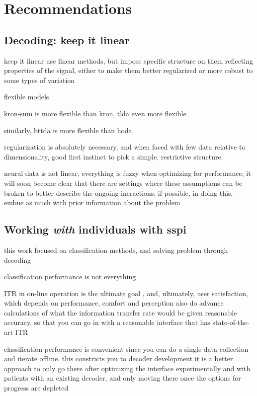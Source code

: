 \section{Recommendations}

\subsection{Decoding: keep it linear}

keep it linear
use linear methods, but impose specific structure on them reflecting properties
of the signal, either to make them better regularized or more robust to some
types of variation

flexible models

kron-sum is more flexible than kron, tlda even more flexible

similarly, bttda is more flexible than hoda

regularization is absolutely necessary, and when faced with few data relative
to dimensionality, good first instinct to pick a simple, restrictive structure.

neural data is not linear, everything is fuzzy
when optimizing for performance, it will soon become clear that there are
settings where these assumptions can be broken to better describe the ongoing
ineractions.
if possible, in doing this, embue as much with prior information about the problem


\subsection{Working \emph{with} individuals with \acs{sspi}}

this work focused on classification methods, and solving problem through
decoding

classification performance is not everything

ITR in on-line operation is the ultimate goal
, and, ultimately, user satisfaction, which depends on performance, comfort and perception
also do advance calculations of what the information transfer rate would be
given reasonable accuracy, so that you can go in with a reasonable interface
that has state-of-the-art ITR

classification performance is convenient since you can do a single data
collection and iterate offline.
this constricts you to decoder development
it is a better approach to only go there after optimizing the interface
experimentally and with patients with an existing
decoder, and only moving there once the options for progress are depleted


